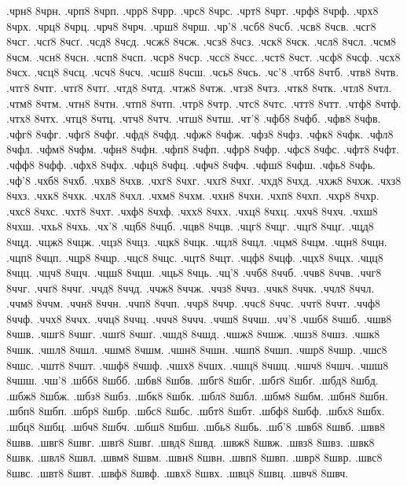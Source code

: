 {.чрн8
8чрн.
.чрп8
8чрп.
.чрр8
8чрр.
.чрс8
8чрс.
.чрт8
8чрт.
.чрф8
8чрф.
.чрх8
8чрх.
.чрц8
8чрц.
.чрч8
8чрч.
.чрш8
8чрш.
.чр'8
.чсб8
8чсб.
.чсв8
8чсв.
.чсг8
8чсг.
.чсґ8
8чсґ.
.чсд8
8чсд.
.чсж8
8чсж.
.чсз8
8чсз.
.чск8
8чск.
.чсл8
8чсл.
.чсм8
8чсм.
.чсн8
8чсн.
.чсп8
8чсп.
.чср8
8чср.
.чсс8
8чсс.
.чст8
8чст.
.чсф8
8чсф.
.чсх8
8чсх.
.чсц8
8чсц.
.чсч8
8чсч.
.чсш8
8чсш.
.чсь8
8чсь.
.чс'8
.чтб8
8чтб.
.чтв8
8чтв.
.чтг8
8чтг.
.чтґ8
8чтґ.
.чтд8
8чтд.
.чтж8
8чтж.
.чтз8
8чтз.
.чтк8
8чтк.
.чтл8
8чтл.
.чтм8
8чтм.
.чтн8
8чтн.
.чтп8
8чтп.
.чтр8
8чтр.
.чтс8
8чтс.
.чтт8
8чтт.
.чтф8
8чтф.
.чтх8
8чтх.
.чтц8
8чтц.
.чтч8
8чтч.
.чтш8
8чтш.
.чт'8
.чфб8
8чфб.
.чфв8
8чфв.
.чфг8
8чфг.
.чфґ8
8чфґ.
.чфд8
8чфд.
.чфж8
8чфж.
.чфз8
8чфз.
.чфк8
8чфк.
.чфл8
8чфл.
.чфм8
8чфм.
.чфн8
8чфн.
.чфп8
8чфп.
.чфр8
8чфр.
.чфс8
8чфс.
.чфт8
8чфт.
.чфф8
8чфф.
.чфх8
8чфх.
.чфц8
8чфц.
.чфч8
8чфч.
.чфш8
8чфш.
.чфь8
8чфь.
.чф'8
.чхб8
8чхб.
.чхв8
8чхв.
.чхг8
8чхг.
.чхґ8
8чхґ.
.чхд8
8чхд.
.чхж8
8чхж.
.чхз8
8чхз.
.чхк8
8чхк.
.чхл8
8чхл.
.чхм8
8чхм.
.чхн8
8чхн.
.чхп8
8чхп.
.чхр8
8чхр.
.чхс8
8чхс.
.чхт8
8чхт.
.чхф8
8чхф.
.чхх8
8чхх.
.чхц8
8чхц.
.чхч8
8чхч.
.чхш8
8чхш.
.чхь8
8чхь.
.чх'8
.чцб8
8чцб.
.чцв8
8чцв.
.чцг8
8чцг.
.чцґ8
8чцґ.
.чцд8
8чцд.
.чцж8
8чцж.
.чцз8
8чцз.
.чцк8
8чцк.
.чцл8
8чцл.
.чцм8
8чцм.
.чцн8
8чцн.
.чцп8
8чцп.
.чцр8
8чцр.
.чцс8
8чцс.
.чцт8
8чцт.
.чцф8
8чцф.
.чцх8
8чцх.
.чцц8
8чцц.
.чцч8
8чцч.
.чцш8
8чцш.
.чць8
8чць.
.чц'8
.ччб8
8ччб.
.ччв8
8ччв.
.ччг8
8ччг.
.ччґ8
8ччґ.
.ччд8
8ччд.
.ччж8
8ччж.
.ччз8
8ччз.
.ччк8
8ччк.
.ччл8
8ччл.
.ччм8
8ччм.
.ччн8
8ччн.
.ччп8
8ччп.
.ччр8
8ччр.
.ччс8
8ччс.
.ччт8
8ччт.
.ччф8
8ччф.
.ччх8
8ччх.
.ччц8
8ччц.
.ччч8
8ччч.
.ччш8
8ччш.
.чч'8
.чшб8
8чшб.
.чшв8
8чшв.
.чшг8
8чшг.
.чшґ8
8чшґ.
.чшд8
8чшд.
.чшж8
8чшж.
.чшз8
8чшз.
.чшк8
8чшк.
.чшл8
8чшл.
.чшм8
8чшм.
.чшн8
8чшн.
.чшп8
8чшп.
.чшр8
8чшр.
.чшс8
8чшс.
.чшт8
8чшт.
.чшф8
8чшф.
.чшх8
8чшх.
.чшц8
8чшц.
.чшч8
8чшч.
.чшш8
8чшш.
.чш'8
.шбб8
8шбб.
.шбв8
8шбв.
.шбг8
8шбг.
.шбґ8
8шбґ.
.шбд8
8шбд.
.шбж8
8шбж.
.шбз8
8шбз.
.шбк8
8шбк.
.шбл8
8шбл.
.шбм8
8шбм.
.шбн8
8шбн.
.шбп8
8шбп.
.шбр8
8шбр.
.шбс8
8шбс.
.шбт8
8шбт.
.шбф8
8шбф.
.шбх8
8шбх.
.шбц8
8шбц.
.шбч8
8шбч.
.шбш8
8шбш.
.шбь8
8шбь.
.шб'8
.швб8
8швб.
.швв8
8швв.
.швг8
8швг.
.швґ8
8швґ.
.швд8
8швд.
.швж8
8швж.
.швз8
8швз.
.швк8
8швк.
.швл8
8швл.
.швм8
8швм.
.швн8
8швн.
.швп8
8швп.
.швр8
8швр.
.швс8
8швс.
.швт8
8швт.
.швф8
8швф.
.швх8
8швх.
.швц8
8швц.
.швч8
8швч.
}
